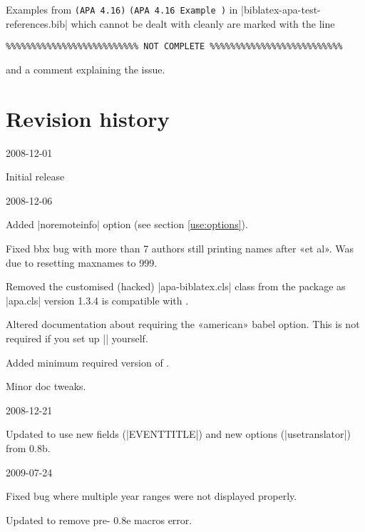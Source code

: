 \documentclass{ltxdockit}
\newcommand\apa[2][]{\ifthenelse{\equal{#1}{}}%
                       {\texttt{(APA #2)}}%
                       {\texttt{(APA #2 Example #1)}}}
\begin{document}
\noindent Examples from \apa{4.16} in |biblatex-apa-test-references.bib|
which cannot be dealt with cleanly are marked with the line

\begin{verbatim}
%%%%%%%%%%%%%%%%%%%%%%%%%% NOT COMPLETE %%%%%%%%%%%%%%%%%%%%%%%%%%
\end{verbatim}

\noindent and a comment explaining the issue.

\section{Revision history}

\begin{changelog}

\begin{release}{0.1}{2008-12-01}
\item Initial release
\end{release}

\begin{release}{0.2}{2008-12-06}
\item Added |noremoteinfo| option (see section \ref{use:options}).
\item Fixed bbx bug with more than 7 authors still printing names after «et al». Was
  due to resetting maxnames to 999.
\item Removed the customised (hacked) |apa-biblatex.cls| class from the package as
  |apa.cls| version 1.3.4 is compatible with .
\item Altered documentation about requiring the «american» babel option.
  This is not required if you set up |\DeclareQuotePunctuation| yourself.
\item Added minimum required version of .
\item Minor doc tweaks.
\end{release}

\begin{release}{0.3}{2008-12-21}
\item Updated to use new fields (|EVENTTITLE|) and new options
  (|usetranslator|) from  0.8b.
\end{release}

\begin{release}{0.4}{2009-07-24}
\item Fixed bug where multiple year ranges were not displayed properly.
\item Updated to remove pre- 0.8e macros error.
\end{release}


\end{changelog}
\end{document}
